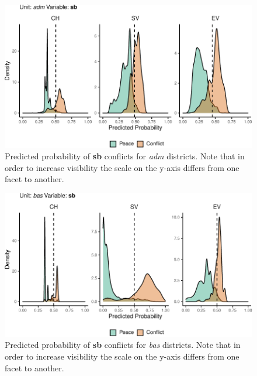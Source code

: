 \documentclass[a4paper,11pt]{article}
\begin{document}
\begin{figure}[H]

{\centering \includegraphics{thesis_files/figure-latex/appendix-densities-3} 

}

\caption[Predicted probability of \textbf{sb} conflicts for \textit{adm} districts.]{Predicted probability of \textbf{sb} conflicts for \textit{adm} districts. Note that in order to increase visibility the scale on the y-axis differs from one facet to another.}\label{fig:appendix-densities-3}
\end{figure}
\begin{figure}[H]

{\centering \includegraphics{thesis_files/figure-latex/appendix-densities-4} 

}

\caption[Predicted probability of \textbf{sb} conflicts for \textit{bas} districts.]{Predicted probability of \textbf{sb} conflicts for \textit{bas} districts. Note that in order to increase visibility the scale on the y-axis differs from one facet to another.}\label{fig:appendix-densities-4}
\end{figure}
\end{document}
